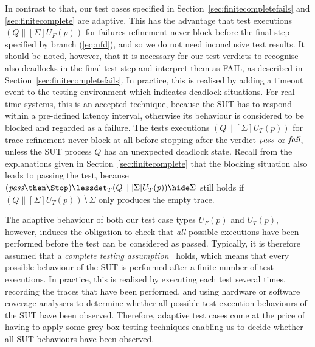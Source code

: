 In 
contrast to that, our test cases specified in
Section~\ref{sec:finitecompletefails} and \ref{sec:finitecomplete} are
adaptive. This has the advantage that test executions $(Q\parallel[\Sigma]
U_F(p))$ for failures refinement never block before the final step specified
by branch (\ref{eq:ufd}), and so we do not need inconclusive test results.
It should be noted, however, that it is
necessary for our test verdicts to recognise also deadlocks in the final test
step and interpret them as FAIL, as described in
Section~\ref{sec:finitecompletefails}. In practice, this is realised by
adding a timeout event to the testing environment which indicates deadlock
situations. For real-time systems, this is an accepted technique, because the
SUT has to respond within a pre-defined latency interval, otherwise its
behaviour is considered to be blocked and regarded as a failure.
The tests executions $(Q\parallel[\Sigma] U_T(p))$ 
for trace refinement never
block at all before stopping after the verdict ${\text{\it pass}}$ or ${\text{\it fail}}$, unless the
SUT process $Q$ has an unexpected deadlock state. 
Recall from the explanations given in Section~\ref{sec:finitecomplete} that the 
blocking situation also leads to passing the test, because 
$(\epass\then \Stop)\lessdet_T (Q\parallel[\Sigma] U_T(p))\hide\Sigma$ still holds
if $(Q\parallel[\Sigma] U_T(p))\hide\Sigma$ only produces the empty trace.

The adaptive behaviour of both our test case types $U_F(p)$ and $U_T(p)$,
however, induces the obligation to check that {\it all}
possible executions have been
performed before the test can be considered as passed. Typically, it is
therefore assumed that a \emph{complete testing
assumption}~\cite{hierons_testing_2004}  holds, which means that every possible
behaviour of the SUT is performed after a finite number of test executions.
In practice, this is realised by executing each test several times, recording
the traces that have been performed, and using hardware or software coverage
analysers to determine whether all possible test execution behaviours of the
SUT have been observed. Therefore, adaptive test cases come at the price of
having to apply some grey-box testing techniques enabling us to decide
whether all SUT behaviours have been observed.

